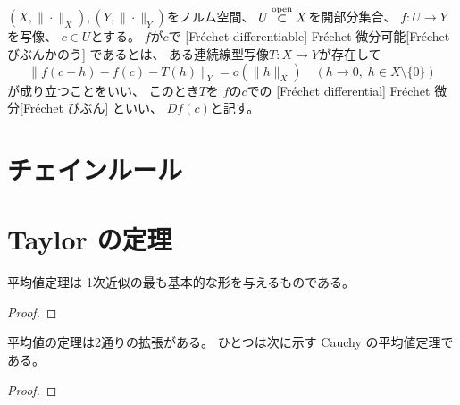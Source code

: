\documentclass[report]{jlreq}
\begin{document}
\begin{definition}[Fr\'echet 微分]
    $(X, \| \cdot \|_X), (Y, \| \cdot \|_Y)$をノルム空間、
    $U \stackrel{\text{open}}{\subset} X$を開部分集合、
    $f \colon U \to Y$を写像、
    $c \in U$とする。
    $f$が$c$で
    [Fr\'echet differentiable]
        {Fr\'echet 微分可能}[Fr\'echet びぶんかのう]
    であるとは、
    ある連続線型写像$T \colon X \to Y$が存在して
    \begin{equation}
        \| f(c + h) - f(c) - T(h) \|_Y = o(\| h \|_X)
            \quad (h \to 0, \; h \in X \setminus \{ 0 \})
    \end{equation}
    が成り立つことをいい、
    このとき$T$を
    $f$の$c$での
    [Fr\'echet differential]
        {Fr\'echet 微分}[Fr\'echet びぶん]
    といい、
    $Df(c)$と記す。
\end{definition}

%
\section{チェインルール}

\TODO{}

%
\section{Taylor の定理}

平均値定理は
1次近似の最も基本的な形を与えるものである。

\begin{theorem}[平均値定理]
    \TODO{}
\end{theorem}

\begin{proof}
    \TODO{}
\end{proof}

平均値の定理は2通りの拡張がある。
ひとつは次に示す Cauchy の平均値定理である。

\begin{theorem}
    \TODO{}
\end{theorem}

\begin{proof}
    \TODO{}
\end{proof}
\end{document}
